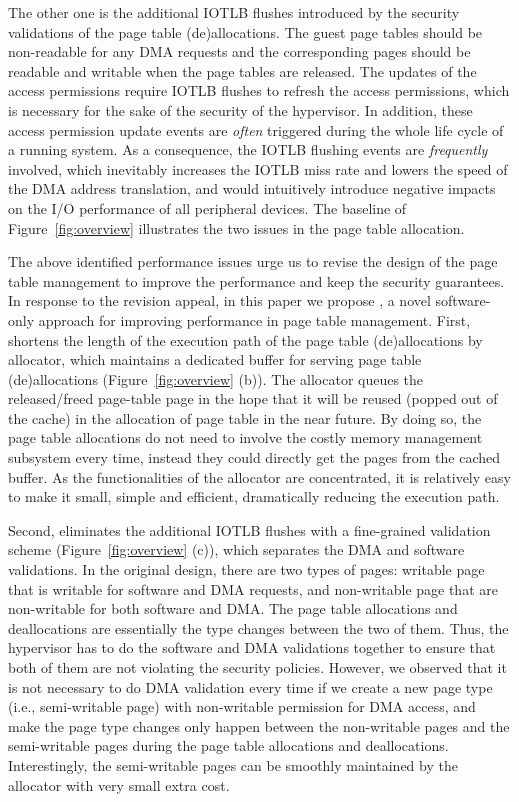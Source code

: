 The other one is the additional IOTLB flushes introduced by the security validations of the page table (de)allocations.
The guest page tables should be non-readable for any DMA requests and the corresponding pages should be readable and writable when the page tables are released.
The updates of the access permissions require IOTLB flushes to refresh the access permissions, which is necessary for the sake of the security of the hypervisor.
In addition, these access permission update events are \emph{often} triggered during the whole life cycle of a running system.
As a consequence, the IOTLB flushing events are \emph{frequently} involved, which inevitably increases the IOTLB miss rate and lowers the speed of the DMA address translation, and would intuitively introduce negative impacts on the I/O performance of all peripheral devices.
The baseline of Figure~\ref{fig:overview} illustrates the two issues in the page table allocation.

The above identified performance issues urge us to revise the design of the page table management to improve the performance and keep the security guarantees.
In response to the revision appeal, in this paper we propose \name, a novel software-only approach for improving performance in page table management.
First, \name shortens the length of the execution path of the page table (de)allocations by \name allocator, which maintains a dedicated buffer for serving page table (de)allocations (Figure~\ref{fig:overview} (b)).
The \name allocator queues the released/freed page-table page in the hope that
it will be reused (popped out of the cache) in the allocation of page table in the near future.
By doing so, the page table allocations do not need to involve the costly memory management subsystem every time, instead they could directly get the pages from the cached buffer.
As the functionalities of the \name allocator are concentrated, it is relatively easy to make it small, simple and efficient, dramatically reducing the execution path.

Second, \name eliminates the additional IOTLB flushes with a fine-grained validation scheme (Figure~\ref{fig:overview} (c)), which separates the DMA and software validations.
In the original design, there are two types of pages: writable page that is writable for software and DMA requests, and non-writable page that are non-writable for both software and DMA.
The page table allocations and deallocations are essentially the type changes between the two of them.
Thus, the hypervisor has to do the software and DMA validations together to ensure that both of them are not violating the security policies.
However, we observed that it is not necessary to do DMA validation every time if we create a new page type (i.e., semi-writable page) with non-writable permission for DMA access, and make the page type changes only happen between the non-writable pages and the semi-writable pages during the page table allocations and deallocations.
Interestingly, the semi-writable pages can be smoothly maintained by the \name allocator with very small extra cost.

